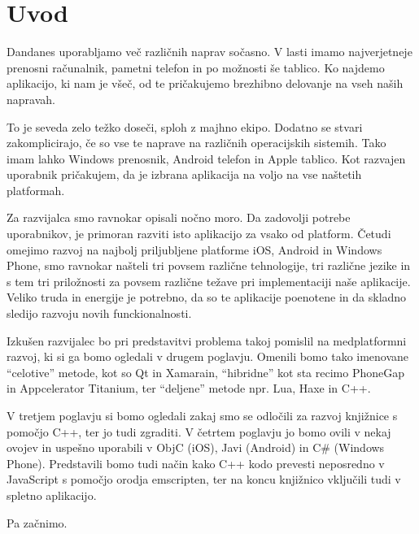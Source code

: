 \graphicspath{{img/}}







\chapter{Uvod}
\label{chap:introduction}


Dandanes uporabljamo več različnih naprav sočasno. V lasti imamo najverjetneje prenosni računalnik, pametni telefon in po možnosti še tablico. Ko najdemo aplikacijo, ki nam je všeč, od te pričakujemo brezhibno delovanje na vseh naših napravah.

To je seveda zelo težko doseči, sploh z majhno ekipo. Dodatno se stvari zakomplicirajo, če so vse te naprave na različnih operacijskih sistemih. Tako imam lahko Windows prenosnik, Android telefon in Apple tablico. Kot razvajen uporabnik pričakujem, da je izbrana aplikacija na voljo na vse naštetih platformah.

Za razvijalca smo ravnokar opisali nočno moro. Da zadovolji potrebe uporabnikov, je primoran razviti isto aplikacijo za vsako od platform. Četudi omejimo razvoj na najbolj priljubljene platforme iOS, Android in Windows Phone, smo ravnokar našteli tri povsem različne tehnologije, tri različne jezike in s tem tri priložnosti za povsem različne težave pri implementaciji naše aplikacije. Veliko truda in energije je potrebno, da so te aplikacije poenotene in da skladno sledijo razvoju novih funckionalnosti.

Izkušen razvijalec bo pri predstavitvi problema takoj pomislil na medplatformni razvoj, ki si ga bomo ogledali v drugem poglavju. Omenili bomo tako imenovane ``celotive'' metode, kot so Qt in Xamarain, ``hibridne'' kot sta recimo PhoneGap in Appcelerator Titanium, ter ``deljene'' metode npr. Lua, Haxe in C++.

V tretjem poglavju si bomo ogledali zakaj smo se odločili za razvoj knjižnice s pomočjo C++, ter jo tudi zgraditi. V četrtem poglavju jo bomo ovili v nekaj ovojev in uspešno uporabili v ObjC (iOS), Javi (Android) in C\# (Windows Phone). Predstavili bomo tudi način kako C++ kodo prevesti neposredno v JavaScript s pomočjo orodja emscripten, ter na koncu knjižnico vključili tudi v spletno aplikacijo.

Pa začnimo.
